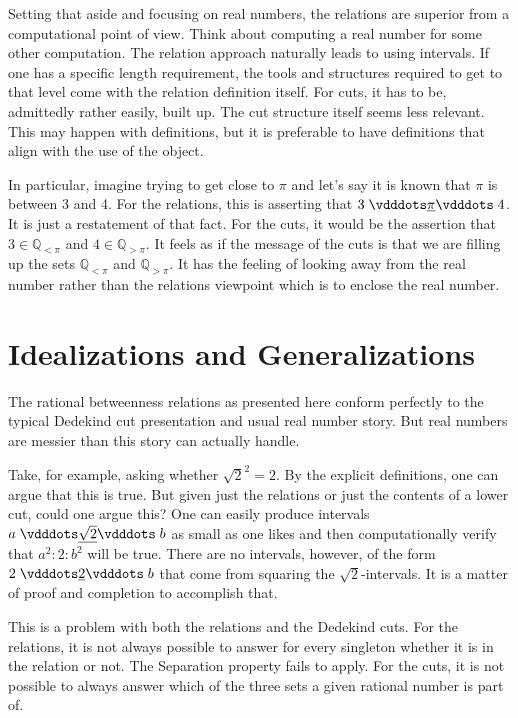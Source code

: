 \documentclass[12pt]{article}
\newcommand{\qcut}[2][x]{\ensuremath{\mathbb{Q}_{#2 #1}}}
\newcommand{\qlt}[1][x]{\qcut[#1]{<}}
\newcommand{\qgt}[1][x]{\qcut[#1]{>}}
\begin{document}
Setting that aside and focusing on real numbers, the relations are superior from a computational point of view. Think about computing a real number for some other computation. The relation approach naturally leads to using intervals. If one has a specific length requirement, the tools and structures required to get to that level come with the relation definition itself. For cuts, it has to be, admittedly rather easily, built up. The cut structure itself seems less relevant. This may happen with definitions, but it is preferable to have definitions that align with the use of the object. 

In particular, imagine trying to get close to $\pi$ and let's say it is known that $\pi$ is between 3 and 4. For the relations, this is asserting that $3 \xrel[\pi] 4$. It is just a restatement of that fact. For the cuts, it would be the assertion that $3 \in \qlt[\pi]$ and $4 \in \qgt[\pi]$. It feels as if the message of the cuts is that we are filling up the sets $\qlt[\pi]$ and $\qgt[\pi]$. It has the feeling of looking away from the real number rather than the relations viewpoint which is to enclose the real number. 


\section{Idealizations and Generalizations}

The rational betweenness relations as presented here conform perfectly to the typical Dedekind cut presentation and usual real number story. But real numbers are messier than this story can actually handle. 

Take, for example, asking whether $\sqrt{2}^2 = 2$. By the explicit definitions, one can argue that this is true. But given just the relations or just the contents of a lower cut, could one argue this? One can easily produce intervals $a \xrel[\sqrt{2}] b$ as small as one likes and then computationally verify that $a^2 : 2 :b^2$ will be true. There are no intervals, however, of the form $2 \xrel[2] b$ that come from squaring the $\sqrt{2}$-intervals. It is a matter of proof and completion to accomplish that. 

This is a problem with both the relations and the Dedekind cuts. For the relations, it is not always possible to answer for every singleton whether it is in the relation or not. The Separation property fails to apply. For the cuts, it is not possible to always answer which of the three sets a given rational number is part of. 
\end{document}
